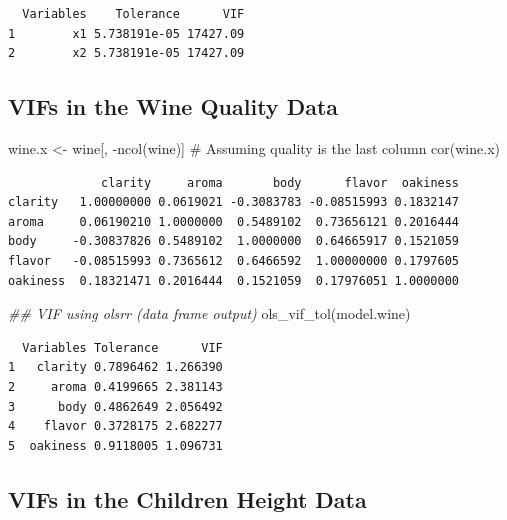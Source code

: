 \documentclass[
  letterpaper,
]{scrbook}
\newenvironment{Shaded}{\begin{snugshade}}{\end{snugshade}}
\newcommand{\CommentTok}[1]{\textcolor[rgb]{0.37,0.37,0.37}{#1}}
\newcommand{\DocumentationTok}[1]{\textcolor[rgb]{0.37,0.37,0.37}{\textit{#1}}}
\newcommand{\FunctionTok}[1]{\textcolor[rgb]{0.28,0.35,0.67}{#1}}
\newcommand{\NormalTok}[1]{\textcolor[rgb]{0.00,0.23,0.31}{#1}}
\newcommand{\OtherTok}[1]{\textcolor[rgb]{0.00,0.23,0.31}{#1}}
\newcommand{\SpecialCharTok}[1]{\textcolor[rgb]{0.37,0.37,0.37}{#1}}
\begin{document}
\begin{verbatim}
  Variables    Tolerance      VIF
1        x1 5.738191e-05 17427.09
2        x2 5.738191e-05 17427.09
\end{verbatim}

\subsection{VIFs in the Wine Quality
Data}\label{vifs-in-the-wine-quality-data}

\begin{Shaded}
\begin{Highlighting}[]
\NormalTok{wine.x }\OtherTok{\textless{}{-}}\NormalTok{ wine[, }\SpecialCharTok{{-}}\FunctionTok{ncol}\NormalTok{(wine)] }\CommentTok{\# Assuming quality is the last column}
\FunctionTok{cor}\NormalTok{(wine.x)}
\end{Highlighting}
\end{Shaded}

\begin{verbatim}
             clarity     aroma       body      flavor  oakiness
clarity   1.00000000 0.0619021 -0.3083783 -0.08515993 0.1832147
aroma     0.06190210 1.0000000  0.5489102  0.73656121 0.2016444
body     -0.30837826 0.5489102  1.0000000  0.64665917 0.1521059
flavor   -0.08515993 0.7365612  0.6466592  1.00000000 0.1797605
oakiness  0.18321471 0.2016444  0.1521059  0.17976051 1.0000000
\end{verbatim}

\begin{Shaded}
\begin{Highlighting}[]
\DocumentationTok{\#\# VIF using olsrr (data frame output)}
\FunctionTok{ols\_vif\_tol}\NormalTok{(model.wine)}
\end{Highlighting}
\end{Shaded}

\begin{verbatim}
  Variables Tolerance      VIF
1   clarity 0.7896462 1.266390
2     aroma 0.4199665 2.381143
3      body 0.4862649 2.056492
4    flavor 0.3728175 2.682277
5  oakiness 0.9118005 1.096731
\end{verbatim}

\subsection{VIFs in the Children Height
Data}\label{vifs-in-the-children-height-data}
\end{document}

